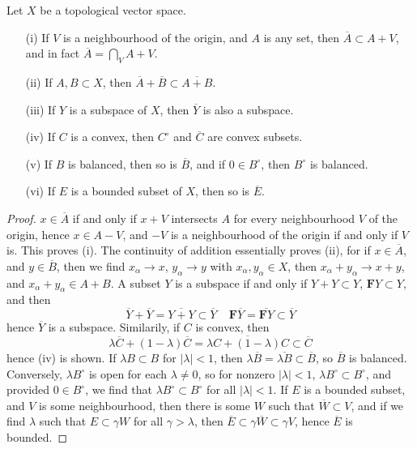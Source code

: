 \begin{theorem}
    Let $X$ be a topological vector space.
    \begin{enumerate}
        \item[(i)] If $V$ is a neighbourhood of the origin, and $A$ is any set, then $\overline{A} \subset A + V$, and in fact $\overline{A} = \bigcap_V A + V$.
        \item[(ii)] If $A,B \subset X$, then $\overline{A} + \overline{B} \subset \overline{A + B}$.
        \item[(iii)] If $Y$ is a subspace of $X$, then $\overline{Y}$ is also a subspace.
        \item[(iv)] If $C$ is a convex, then $C^\circ$ and $\overline{C}$ are convex subsets.
        \item[(v)] If $B$ is balanced, then so is $\overline{B}$, and if $0 \in B^\circ$, then $B^\circ$ is balanced.
        \item[(vi)] If $E$ is a bounded subset of $X$, then so is $\overline{E}$.
    \end{enumerate}
\end{theorem}
\begin{proof}
    $x \in \overline{A}$ if and only if $x + V$ intersects $A$ for every neighbourhood $V$ of the origin, hence $x \in A - V$, and $-V$ is a neighbourhood of the origin if and only if $V$ is. This proves (i). The continuity of addition essentially proves (ii), for if $x \in \overline{A}$, and $y \in \overline{B}$, then we find $x_\alpha \to x$, $y_\alpha \to y$ with $x_\alpha, y_\alpha \in X$, then $x_\alpha + y_\alpha \to x + y$, and $x_\alpha + y_\alpha \in A + B$. A subset $Y$ is a subspace if and only if $Y + Y \subset Y$, $\mathbf{F} Y \subset Y$, and then
    \[ \overline{Y} + \overline{Y} = \overline{Y + Y} \subset \overline{Y}\ \ \ \ \ \mathbf{F} \overline{Y} = \overline{\mathbf{F} Y} \subset \overline{Y} \]
    hence $\overline{Y}$ is a subspace. Similarily, if $C$ is convex, then
    \[ \lambda \overline{C} + (1 - \lambda) \overline{C} = \overline{\lambda C + (1 - \lambda) C} \subset \overline{C} \]
    hence (iv) is shown. If $\lambda B \subset B$ for $|\lambda| < 1$, then $\lambda \overline{B} = \overline{\lambda B} \subset \overline{B}$, so $\overline{B}$ is balanced. Conversely, $\lambda B^\circ$ is open for each $\lambda \neq 0$, so for nonzero $|\lambda| < 1$, $\lambda B^\circ \subset B^\circ$, and provided $0 \in B^\circ$, we find that $\lambda B^\circ \subset B^\circ$ for all $|\lambda| < 1$. If $E$ is a bounded subset, and $V$ is some neighbourhood, then there is some $W$ such that $\overline{W} \subset V$, and if we find $\lambda$ such that $E \subset \gamma W$ for all $\gamma > \lambda$, then $\overline{E} \subset \gamma \overline{W} \subset \gamma V$, hence $\overline{E}$ is bounded.
\end{proof}


